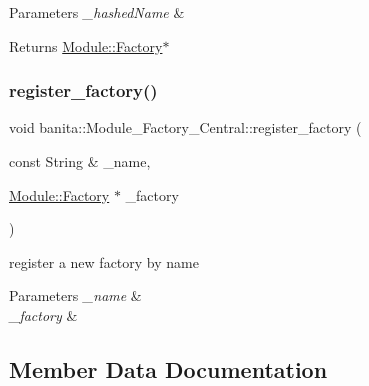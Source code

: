 \begin{DoxyParams}{Parameters}
{\em \+\_\+hashed\+Name} & \\
\hline
\end{DoxyParams}
\begin{DoxyReturn}{Returns}
\mbox{\hyperlink{classbanita_1_1_module_1_1_factory}{Module\+::\+Factory}}$\ast$ 
\end{DoxyReturn}
\mbox{\label{classbanita_1_1_module___factory___central_aef12a82bd2c051f7be1fc0ef22747517}} 
\subsubsection{\texorpdfstring{register\_factory()}{register\_factory()}}
{\footnotesize\ttfamily void banita\+::\+Module\+\_\+\+Factory\+\_\+\+Central\+::register\+\_\+factory (\begin{DoxyParamCaption}\item[{const String \&}]{\+\_\+name,  }\item[{\mbox{\hyperlink{classbanita_1_1_module_1_1_factory}{Module\+::\+Factory}} $\ast$}]{\+\_\+factory }\end{DoxyParamCaption})\hspace{0.3cm}{\ttfamily [inline]}}



register a new factory by name 


\begin{DoxyParams}{Parameters}
{\em \+\_\+name} & \\
\hline
{\em \+\_\+factory} & \\
\hline
\end{DoxyParams}


\subsection{Member Data Documentation}
\mbox{\label{classbanita_1_1_module___factory___central_ad7153b8c574028a3165263b7159ac450}} 
